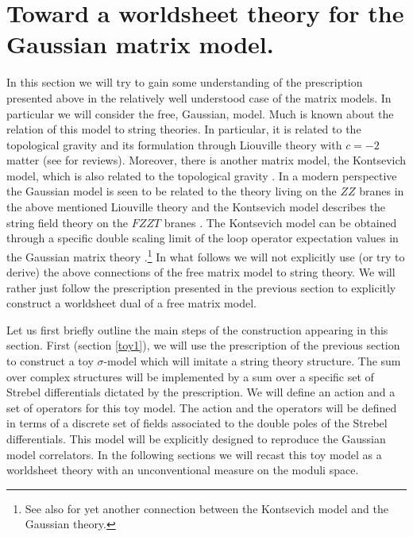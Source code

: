 \documentclass[11pt]{JHEP3}
\def\s{\sigma}
\def\s{\sigma}
\begin{document}
\section{Toward a worldsheet theory for the Gaussian matrix model.}\label{string}


In this section we will try to gain some understanding of the prescription presented above
in the relatively well understood case of the matrix models. In particular
we will consider the free, Gaussian, model. Much is known  about the relation
of this model to string theories. In particular, it is related to the 
topological gravity \cite{Witten:1989ig} and its formulation through Liouville theory with $c=-2$ matter
\cite{Distler:1989ax,Klebanov:1990sn} (see \cite{toprev} for reviews).
Moreover, there is another matrix model, the Kontsevich model, which is also related
to the topological gravity \cite{Kontsevich:1992ti}. In a modern perspective the Gaussian model is seen to be related to the
theory living on the $ZZ$ branes \cite{McGreevy:2003kb} in the above mentioned Liouville theory and the
Kontsevich model describes the string field theory on the $FZZT$ branes \cite{Gaiotto:2003yb}. The Kontsevich
model can be obtained through a specific double scaling limit of the loop operator
expectation values in the Gaussian matrix theory \cite{Maldacena:2004sn,Hashimoto:2005bf}.\footnote{See also \cite{Okounkov1}
for yet another connection between the Kontsevich model and the Gaussian theory.}  In what follows
we will not explicitly use (or try to derive) the above connections of the free matrix model to string theory.
We will rather just follow  the prescription presented in the previous section
to explicitly construct a worldsheet dual of a free matrix model.


Let us first briefly outline the main steps of the construction appearing in this section. First 
(section \ref{toy1}), we 
will use the prescription of the previous section to construct a toy $\s$-model which  will imitate a string theory structure. 
The sum over complex structures will be implemented by a sum over 
a specific set of Strebel differentials dictated by the prescription.
 We will define an action and a set of operators for this
toy model. The action and the operators will be defined in terms of a discrete set 
of fields associated to the double poles of the Strebel differentials.
This model will be explicitly designed to reproduce the Gaussian model correlators.
In the following sections we will recast this toy model as a 
worldsheet theory with an unconventional measure on the moduli space. 
 
\end{document}
